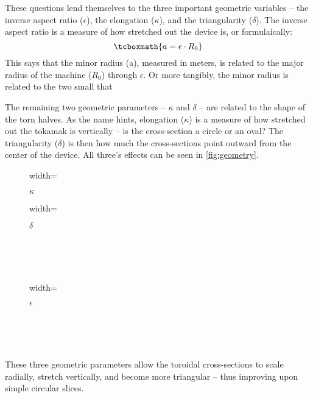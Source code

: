These questions lend themselves to the three important geometric variables -- the inverse aspect ratio ($\epsilon$), the elongation ($\kappa$), and the triangularity ($\delta$). The inverse aspect ratio is a measure of how stretched out the device is, or formulaically:
\begin{equation}
	\label{eq:a}
	\tcboxmath{
	a = \epsilon \cdot R_0
	}
\end{equation}
This says that the minor radius (a), measured in meters, is related to the major radius of the machine ($R_0$) through $\epsilon$. Or more tangibly, the minor radius is related to the two small  that 

The remaining two geometric parameters -- $\kappa$ and $\delta$ -- are related to the shape of the torn halves. As the name hints, elongation ($\kappa$) is a measure of how stretched out the tokamak is vertically -- is the cross-section a circle or an oval? The triangularity ($\delta$) is then how much the cross-sections point outward from the center of the device. All three's effects can be seen in \cref{fig:geometry}. 

\begin{figure*}[h]
    \centering
    \hfill
    \begin{subfigure}[t]{0.45\textwidth}
        \centering
		\begin{adjustbox}{width=\textwidth}
			\Large
			
		\end{adjustbox}
        \caption{$\kappa$}
    \end{subfigure}
    \hfill
    \begin{subfigure}[t]{0.45\textwidth}
        \centering
		\begin{adjustbox}{width=\textwidth}
			\Large
			
		\end{adjustbox}
        \caption{$\delta$}
    \end{subfigure}
    \hfill \hfill ~\\ ~\\ ~\\
    \begin{subfigure}[t]{0.6\textwidth}
        \centering
		\begin{adjustbox}{width=\textwidth}
			\large
			
		\end{adjustbox}
        \caption{$\epsilon$}
    \end{subfigure} ~\\ ~\\
    \caption{Geometric Parameters} ~\\
    \small These three geometric parameters allow the toroidal cross-sections to scale radially, stretch vertically, and become more triangular -- thus improving upon simple circular slices.
    \label{fig:geometry}
\end{figure*}


